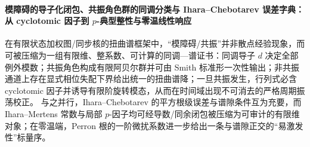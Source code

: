 \paragraph{模障碍的导子化闭包、共振角色群的同调分类与 Ihara--Chebotarev 误差字典：从 cyclotomic 因子到 \texorpdfstring{$p$}{p}-典型整性与零温线性响应}
在有限状态加权图/同步核的扭曲谱框架中，“模障碍/共振”并非散点经验现象，而可被压缩为一组有限维、整系数、可计算的同调—谱证书：同调导子 \(d\) 决定全部例外模数；共振角色构成有限阿贝尔群并可由 Smith 标准形一次性输出；非共振通道上存在显式相位失配下界给出统一的扭曲谱降；一旦共振发生，行列式必含 cyclotomic 因子并诱导有限阶旋转模态，从而在时间域出现不可消去的严格周期振荡校正。
与之并行，Ihara--Chebotarev 的平方根级误差与谱隙条件互为充要，而 Ihara--Mertens 常数与局部 \(p\)-因子均可经导数/同余闭包被压缩为可审计的有限维对象；在零温端，Perron 根的一阶微扰系数进一步给出一条与谱隙正交的“易激发性”标量序。
